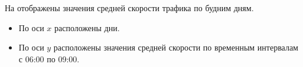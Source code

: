 На  отображены значения средней скорости трафика по будним дням.
\begin{itemize}
	\item По оси $x$ расположены дни.
	\item По оси $y$ расположены значения средней скорости по временным интервалам с 06:00 по 09:00.
\end{itemize}
%
